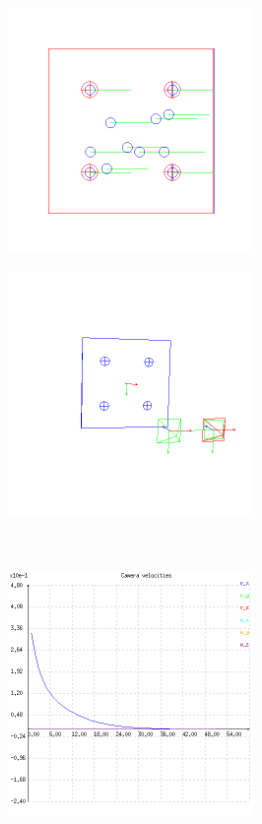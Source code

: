 \begin{figure}[ht!]
\centering
\begin{mdframed}[linecolor=black!30,backgroundcolor=black!5]
  \centering
  \begin{subfigure}{.48\textwidth}
    \centering
    \includegraphics[width=65mm]{figures/plots/ex1pimage.png}
    \caption{}
    \label{fig:ex1cimage}
  \end{subfigure}
  \begin{subfigure}{.48\textwidth}
    \centering
    \includegraphics[width=65mm]{figures/plots/ex1pscene.png}
    \caption{}
    \label{fig:ex1cscene}
  \end{subfigure}
  \\
  \begin{subfigure}{.48\textwidth}
    \centering
    \includegraphics[width=65mm]{figures/plots/ex1cvelocity.png}

\end{subfigure}
\end{mdframed}
\end{figure}
